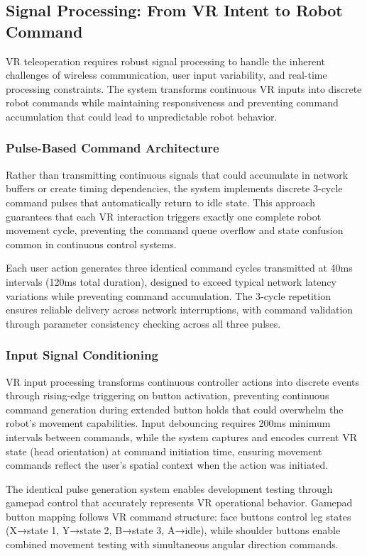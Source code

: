 \subsection{Signal Processing: From VR Intent to Robot Command}

VR teleoperation requires robust signal processing to handle the inherent challenges of wireless communication, user input variability, and real-time processing constraints. The system transforms continuous VR inputs into discrete robot commands while maintaining responsiveness and preventing command accumulation that could lead to unpredictable robot behavior.

\subsubsection{Pulse-Based Command Architecture}
Rather than transmitting continuous signals that could accumulate in network buffers or create timing dependencies, the system implements discrete 3-cycle command pulses that automatically return to idle state. This approach guarantees that each VR interaction triggers exactly one complete robot movement cycle, preventing the command queue overflow and state confusion common in continuous control systems.

Each user action generates three identical command cycles transmitted at 40ms intervals (120ms total duration), designed to exceed typical network latency variations while preventing command accumulation. The 3-cycle repetition ensures reliable delivery across network interruptions, with command validation through parameter consistency checking across all three pulses.

\subsubsection{Input Signal Conditioning}
VR input processing transforms continuous controller actions into discrete events through rising-edge triggering on button activation, preventing continuous command generation during extended button holds that could overwhelm the robot's movement capabilities. Input debouncing requires 200ms minimum intervals between commands, while the system captures and encodes current VR state (head orientation) at command initiation time, ensuring movement commands reflect the user's spatial context when the action was initiated.

The identical pulse generation system enables development testing through gamepad control that accurately represents VR operational behavior. Gamepad button mapping follows VR command structure: face buttons control leg states (X→state 1, Y→state 2, B→state 3, A→idle), while shoulder buttons enable combined movement testing with simultaneous angular direction commands.

